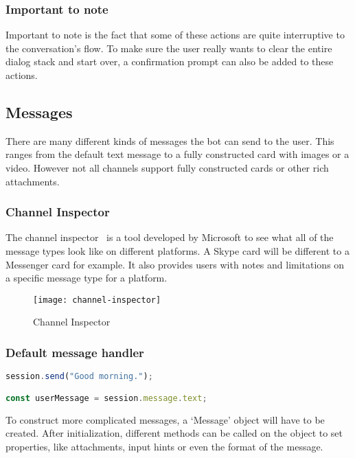 \subsubsection{Important to note}

Important to note is the fact that some of these actions are quite interruptive to the conversation's flow. To make sure the user really wants to clear the entire dialog stack and start over, a confirmation prompt can also be added to these actions.

\subsection{Messages}

There are many different kinds of messages the bot can send to the user. This ranges from the default text message to a fully constructed card with images or a video. However not all channels support fully constructed cards or other rich attachments.

\subsubsection{Channel Inspector}

The channel inspector~\cite{channel-inspector} is a tool developed by Microsoft to see what all of the message types look like on different platforms. A Skype card will be different to a Messenger card for example. It also provides users with notes and limitations on a specific message type for a platform.

\begin{figure}[ht]
	\centering
	\texttt{[image: channel-inspector]}
	\caption{Channel Inspector~\cite{channel-inspector}}
	\label{fig:channel-inspector}
\end{figure}

\subsubsection{Default message handler}

\begin{lstlisting}[language=JavaScript,caption=Sending a simple text message or reading the message from the user is very easy,label=listing:send-text-message]
session.send("Good morning.");

const userMessage = session.message.text;
\end{lstlisting}

To construct more complicated messages, a `Message' object will have to be created. After initialization, different methods can be called on the object to set properties, like attachments, input hints or even the format of the message.

